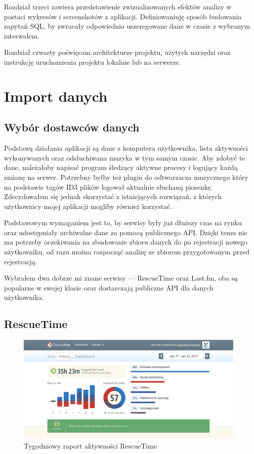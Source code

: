 \documentclass[brudnopis]{xmgr}
\begin{document}
    Rozdział trzeci zawiera przedstawienie zwizualizowanych efektów analizy w postaci wykresów i screenshotów z aplikacji.
    Definiowaniuję sposób budowania zapytań SQL, by zwracały odpowiednio uszeregowane dane w czasie z wybranym interwałem.

    Rozdział czwarty poświęcam architekturze projektu, użytych narzędzi oraz instrukcję uruchomienia projektu lokalnie lub na serwerze.

\chapter{Import danych}

    \section{Wybór dostawców danych}

    Podstawą działania aplikacji są dane z komputera użytkownika,
    lista aktywności wykonywanych oraz odsłuchiwana muzyka w tym samym czasie.
    Aby zdobyć te dane, należałoby napisać program śledzący aktywne procesy i logujący każdą zmianę na serwer.
    Potrzebny byłby też plugin do odtwarzacza muzycznego który na podstawie tagów ID3 plików logował aktualnie słuchaną piosenkę.
    Zdecydowałem się jednak skorzystać z istniejących rozwiązań, z których użytkownicy mojej aplikacji mogliby również korzystać.

    Podstawowym wymaganiem jest to, by serwisy były już dłuższy czas na rynku oraz udostępniały archiwalne dane za pomocą publicznego API.
    Dzięki temu nie ma potrzeby oczekiwania na zbudowanie zbioru danych do po rejestracji nowego użytkowniku,
    od razu można rozpocząć analizę ze zbiorem przygotowanym przed rejestracją.

    Wybrałem dwa dobrze mi znane serwisy --- RescueTime oraz Last.fm,
    oba są popularne w swojej klasie oraz dostarczają publiczne API dla danych użytkownika.

        \section*{RescueTime}

        \begin{figure}
          \includegraphics[width=\linewidth]{fig/rescuetime-dashboard.png}
          \caption{Tygodniowy raport aktywności RescueTime}
          \label{fig:rescuetime-dashboard}
        \end{figure}
\end{document}
